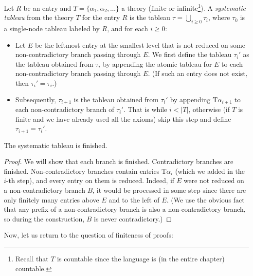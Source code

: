 \begin{definition}
Let $R$ be an entry and $T = \{\alpha_1, \alpha_2, \dots\}$ a theory (finite or infinite\footnote{Recall that $T$ is countable since the language is (in the entire chapter) countable.}). A \emph{systematic tableau} from the theory $T$ for the entry $R$ is the tableau $\tau = \bigcup_{i \geq 0} \tau_i$, where $\tau_0$ is a single-node tableau labeled by $R$, and for each $i \geq 0$:

\begin{itemize}
    \item Let $E$ be the leftmost entry at the smallest level that is not reduced on some non-contradictory branch passing through $E$. We first define the tableau $\tau_i'$ as the tableau obtained from $\tau_i$ by appending the atomic tableau for $E$ to each non-contradictory branch passing through $E$. (If such an entry does not exist, then $\tau_i' = \tau_i$.)
    \item Subsequently, $\tau_{i+1}$ is the tableau obtained from $\tau_i'$ by appending $\mathrm{T}\alpha_{i+1}$ to each non-contradictory branch of $\tau_i'$. That is while $i < |T|$, otherwise (if $T$ is finite and we have already used all the axioms) skip this step and define $\tau_{i+1} = \tau_i'$.
\end{itemize}    
\end{definition}

\begin{lemma}\label{lemma:systematic-is-finished}
    The systematic tableau is finished.
\end{lemma}
\begin{proof}
    We will show that each branch is finished. Contradictory branches are finished. Non-contradictory branches contain entries $\mathrm{T}\alpha_i$ (which we added in the $i$-th step), and every entry on them is reduced. Indeed, if $E$ were not reduced on a non-contradictory branch $B$, it would be processed in some step since there are only finitely many entries above $E$ and to the left of $E$. (We use the obvious fact that any prefix of a non-contradictory branch is also a non-contradictory branch, so during the construction, $B$ is never contradictory.)
\end{proof}

Now, let us return to the question of finiteness of proofs:


